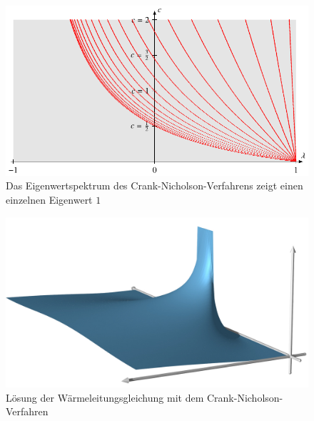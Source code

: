 \begin{figure}
\centering
\includegraphics{chapters/70-pde/images/cnspektrum.pdf}
\caption{Das Eigenwertspektrum des Crank-Nicholson-Verfahrens zeigt
einen einzelnen Eigenwert $1$ 
\label{buch:pde:waerme:cranknicholson:spektrum}}
\end{figure}
\begin{figure}
\centering
\includegraphics{chapters/70-pde/images/cranknicholson.jpg}
\caption{Lösung der Wärmeleitungsgleichung mit dem Crank-Nicholson-Verfahren
\label{buch:pde:waerme:figure:cranknicholson}}
\end{figure}

